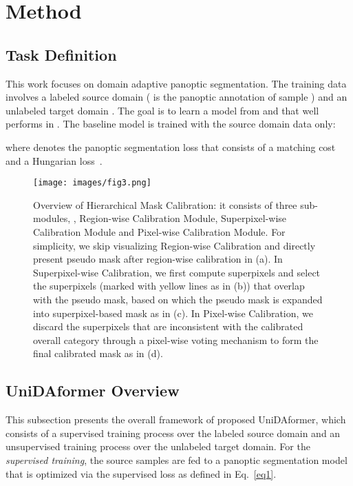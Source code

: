 \documentclass[10pt,twocolumn,letterpaper]{article}
\begin{document}
\section{Method}

\subsection{Task Definition}
This work focuses on domain adaptive panoptic segmentation. The training data involves a labeled source domain  ( is the panoptic annotation of sample {}) and an unlabeled target domain . The goal is to learn a model  from  and  that well performs in . The baseline model is trained with the source domain data  only:


where  denotes the panoptic segmentation loss that consists of a matching cost and a Hungarian loss~\cite{carion2020detr}.

\begin{figure*}[t]
\centering
\texttt{[image: images/fig3.png]}
\caption{
Overview of Hierarchical Mask Calibration:
it consists of three sub-modules, , Region-wise Calibration Module, Superpixel-wise Calibration Module and Pixel-wise Calibration Module. 
For simplicity, we skip visualizing Region-wise Calibration and directly present pseudo mask after region-wise calibration in (a).
In Superpixel-wise Calibration, we first compute superpixels  and select the superpixels (marked with yellow lines as in (b)) that overlap with the pseudo mask, based on which the pseudo mask is expanded into superpixel-based mask  as in (c). In Pixel-wise Calibration, we discard the superpixels that are inconsistent with the calibrated overall category through a pixel-wise voting mechanism to form the final calibrated mask  as in (d).
}
\label{fig:shape}
\end{figure*}

\subsection{UniDAformer Overview}

This subsection presents the overall framework of proposed UniDAformer, which consists of a supervised training process over the labeled source domain and an unsupervised training process over the unlabeled target domain. 
For the \textit{supervised training}, the source samples  are fed to a panoptic segmentation model  that is optimized via the supervised loss  as defined in Eq.~\ref{eq1}.
\end{document}
